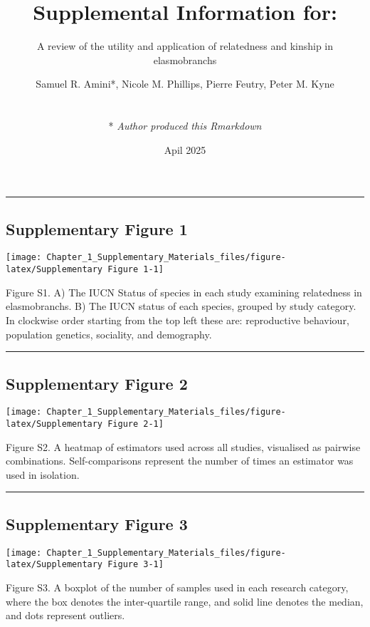 \documentclass[
  a4paper]{article}
\title{Supplemental Information for:}
\subtitle{A review of the utility and application of relatedness and
kinship in elasmobranchs}
\author{Samuel R. Amini*, Nicole M. Phillips, Pierre Feutry, Peter M.
Kyne\\
\strut \\
* \emph{Author produced this Rmarkdown}}
\date{Apil 2025}
\begin{document}
\maketitle

{
\setcounter{tocdepth}{5}
\tableofcontents
}
\begin{center}\rule{0.5\linewidth}{0.5pt}\end{center}

\pagebreak

\subsection{Supplementary Figure 1}\label{supplementary-figure-1}

\texttt{[image: Chapter\_1\_Supplementary\_Materials\_files/figure-latex/Supplementary Figure 1-1]}

Figure S1. A) The IUCN Status of species in each study examining
relatedness in elasmobranchs. B) The IUCN status of each species,
grouped by study category. In clockwise order starting from the top left
these are: reproductive behaviour, population genetics, sociality, and
demography.

\begin{center}\rule{0.5\linewidth}{0.5pt}\end{center}

\pagebreak

\subsection{Supplementary Figure 2}\label{supplementary-figure-2}

\texttt{[image: Chapter\_1\_Supplementary\_Materials\_files/figure-latex/Supplementary Figure 2-1]}

Figure S2. A heatmap of estimators used across all studies, visualised
as pairwise combinations. Self-comparisons represent the number of times
an estimator was used in isolation.

\begin{center}\rule{0.5\linewidth}{0.5pt}\end{center}

\pagebreak

\subsection{Supplementary Figure 3}\label{supplementary-figure-3}

\texttt{[image: Chapter\_1\_Supplementary\_Materials\_files/figure-latex/Supplementary Figure 3-1]}

Figure S3. A boxplot of the number of samples used in each research
category, where the box denotes the inter-quartile range, and solid line
denotes the median, and dots represent outliers.
\end{document}
